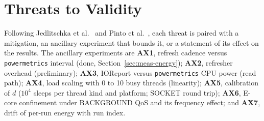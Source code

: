 
\section{Threats to Validity}\label{sec:threats}
Following Jedlitschka et al.~\cite{jedlitschka2008reporting} and Pinto et al.~\cite{pinto2014energy}, each threat is paired with a mitigation, an ancillary experiment that bounds it, or a statement of its effect on the results. The ancillary experiments are \textbf{AX1}, refresh cadence versus \texttt{powermetrics} interval (done, Section~\ref{sec:meas-energy}); \textbf{AX2}, refresher overhead (preliminary); \textbf{AX3}, IOReport versus \texttt{powermetrics} CPU power (read path); \textbf{AX4}, load scaling with 0 to 10 busy threads (linearity); \textbf{AX5}, calibration of $d$ ($10^4$ sleeps per thread kind and platform; SOCKET round trip); \textbf{AX6}, E-core confinement under BACKGROUND QoS and its frequency effect; and \textbf{AX7}, drift of per-run energy with run index.

